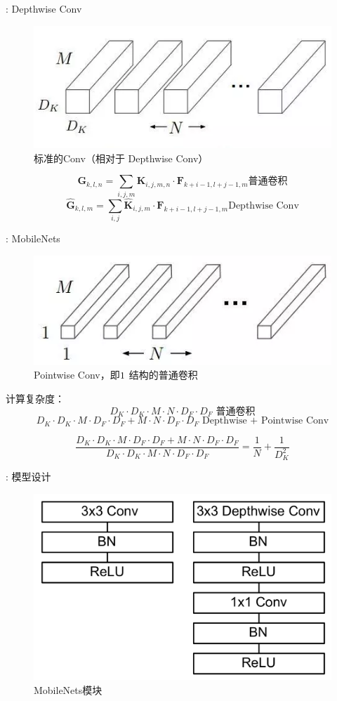\documentclass[UTF8, fontset=founder, aspectratio=43, 10pt, t]{ctexbeamer}
\begin{document}
\begin{frame}{\titleprefix: Depthwise Conv}
	\begin{figure}
		\centering
		\includegraphics[width=0.5\linewidth]{Images/depthwise_2}
		\caption{标准的Conv（相对于 Depthwise Conv）}
		\label{fig:depthwise2}
	\end{figure}
	\[
	\mathbf{G}_{k, l, n}=\sum_{i, j, m} \mathbf{K}_{i, j, m, n} \cdot \mathbf{F}_{k+i-1, l+j-1, m}
	\text{普通卷积}
	\]	
	\[
	\hat{\mathbf{G}}_{k, l, m}=\sum_{i, j} \hat{\mathbf{K}}_{i, j, m} \cdot \mathbf{F}_{k+i-1, l+j-1, m}
	\text{Depthwise Conv}
	\]

\end{frame}

\begin{frame}{\titleprefix: MobileNets}
	\begin{figure}
		\centering
		\includegraphics[width=0.5\linewidth]{Images/pointwise_1}
		\caption{Pointwise Conv，即$1\time 1$ 结构的普通卷积}
		\label{fig:pointwise1}
	\end{figure}
	
	计算复杂度：
	\[
	D_{K} \cdot D_{K} \cdot M \cdot N \cdot D_{F} \cdot D_{F} 
	\text{ 普通卷积}
	\]	
	\[
	D_{K} \cdot D_{K} \cdot M \cdot D_{F} \cdot D_{F}+M \cdot N \cdot D_{F} \cdot D_{F} 
	\text{ Depthwise + Pointwise Conv}
	\]
	
	\[
	\frac{D_{K} \cdot D_{K} \cdot M \cdot D_{F} \cdot D_{F}+M \cdot N \cdot D_{F} \cdot D_{F}}{D_{K} \cdot D_{K} \cdot M \cdot N \cdot D_{F} \cdot D_{F}} = \frac{1}{N}+\frac{1}{D_{K}^{2}} 
	\]
\end{frame}

\begin{frame}{\titleprefix: 模型设计}
	\begin{figure}
		\centering
		\includegraphics[width=0.7\linewidth]{Images/mobilenetblock}
		\caption{MobileNets模块}
		\label{fig:mobilenetblock}
	\end{figure}

\end{frame}
\end{document}
